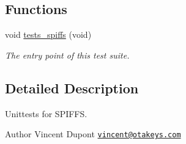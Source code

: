 \subsection*{Functions}
\begin{DoxyCompactItemize}
\item 
void \hyperlink{group__unittests_ga80de15b6e1bf2cc394a940d69830d042}{tests\+\_\+spiffs} (void)
\begin{DoxyCompactList}\small\item\em The entry point of this test suite. \end{DoxyCompactList}\end{DoxyCompactItemize}


\subsection{Detailed Description}
Unittests for S\+P\+I\+F\+FS. 

\begin{DoxyAuthor}{Author}
Vincent Dupont \href{mailto:vincent@otakeys.com}{\tt vincent@otakeys.\+com} 
\end{DoxyAuthor}
